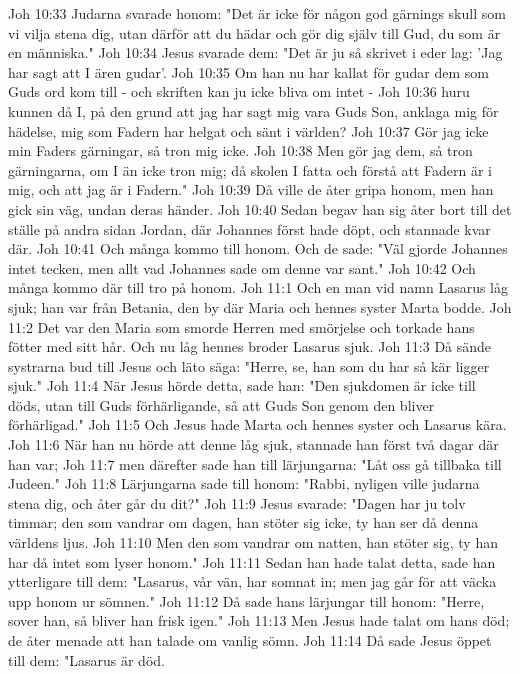 Joh 10:33  Judarna svarade honom: "Det är icke för någon god gärnings skull som vi vilja stena dig, utan därför att du hädar och gör dig själv till Gud, du som är en människa."
Joh 10:34  Jesus svarade dem: "Det är ju så skrivet i eder lag: 'Jag har sagt att I ären gudar'.
Joh 10:35  Om han nu har kallat för gudar dem som Guds ord kom till - och skriften kan ju icke bliva om intet -
Joh 10:36  huru kunnen då I, på den grund att jag har sagt mig vara Guds Son, anklaga mig för hädelse, mig som Fadern har helgat och sänt i världen?
Joh 10:37  Gör jag icke min Faders gärningar, så tron mig icke.
Joh 10:38  Men gör jag dem, så tron gärningarna, om I än icke tron mig; då skolen I fatta och förstå att Fadern är i mig, och att jag är i Fadern."
Joh 10:39  Då ville de åter gripa honom, men han gick sin väg, undan deras händer.
Joh 10:40  Sedan begav han sig åter bort till det ställe på andra sidan Jordan, där Johannes först hade döpt, och stannade kvar där.
Joh 10:41  Och många kommo till honom. Och de sade: "Väl gjorde Johannes intet tecken, men allt vad Johannes sade om denne var sant."
Joh 10:42  Och många kommo där till tro på honom.
Joh 11:1  Och en man vid namn Lasarus låg sjuk; han var från Betania, den by där Maria och hennes syster Marta bodde.
Joh 11:2  Det var den Maria som smorde Herren med smörjelse och torkade hans fötter med sitt hår. Och nu låg hennes broder Lasarus sjuk.
Joh 11:3  Då sände systrarna bud till Jesus och läto säga: "Herre, se, han som du har så kär ligger sjuk."
Joh 11:4  När Jesus hörde detta, sade han: "Den sjukdomen är icke till döds, utan till Guds förhärligande, så att Guds Son genom den bliver förhärligad."
Joh 11:5  Och Jesus hade Marta och hennes syster och Lasarus kära.
Joh 11:6  När han nu hörde att denne låg sjuk, stannade han först två dagar där han var;
Joh 11:7  men därefter sade han till lärjungarna: "Låt oss gå tillbaka till Judeen."
Joh 11:8  Lärjungarna sade till honom: "Rabbi, nyligen ville judarna stena dig, och åter går du dit?"
Joh 11:9  Jesus svarade: "Dagen har ju tolv timmar; den som vandrar om dagen, han stöter sig icke, ty han ser då denna världens ljus.
Joh 11:10  Men den som vandrar om natten, han stöter sig, ty han har då intet som lyser honom."
Joh 11:11  Sedan han hade talat detta, sade han ytterligare till dem: "Lasarus, vår vän, har somnat in; men jag går för att väcka upp honom ur sömnen."
Joh 11:12  Då sade hans lärjungar till honom: "Herre, sover han, så bliver han frisk igen."
Joh 11:13  Men Jesus hade talat om hans död; de åter menade att han talade om vanlig sömn.
Joh 11:14  Då sade Jesus öppet till dem: "Lasarus är död.
